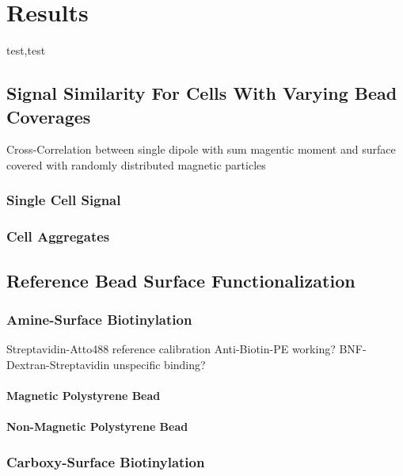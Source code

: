 \chapter{Results}
test,test

\section{Signal Similarity For Cells With Varying Bead Coverages}
Cross-Correlation between single dipole with sum magentic moment and surface covered with randomly distributed magnetic particles

\subsection{Single Cell Signal}

\subsection{Cell Aggregates}

\section{Reference Bead Surface Functionalization}

\subsection{Amine-Surface Biotinylation}
Streptavidin-Atto488 reference calibration
Anti-Biotin-PE working?
BNF-Dextran-Streptavidin unspecific binding?


\subsubsection{Magnetic Polystyrene Bead}

\subsubsection{Non-Magnetic Polystyrene Bead}

\subsection{Carboxy-Surface Biotinylation}

